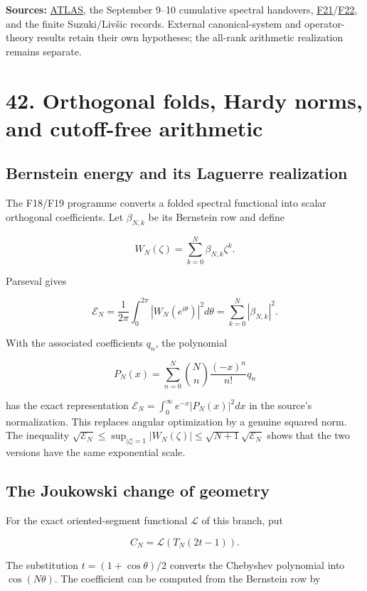 \documentclass[
  10pt,
  a4paper,
  10pt,
  oneside,
  openany]{book}
\begin{document}
\textbf{Sources:} \hyperref[source-atlas]{ATLAS}, the September 9--10
cumulative spectral handovers,
\hyperref[source-f21]{F21}/\hyperref[source-f22]{F22}, and the finite
Suzuki/Livšic records. External canonical-system and operator-theory
results retain their own hypotheses; the all-rank arithmetic realization
remains separate.

\section{42. Orthogonal folds, Hardy norms, and cutoff-free
arithmetic}\label{ch-folds}

\subsection{Bernstein energy and its Laguerre
realization}\label{bernstein-energy-and-its-laguerre-realization}

The F18/F19 programme converts a folded spectral functional into scalar
orthogonal coefficients. Let \(\beta_{N,k}\) be its Bernstein row and
define

\[
 W_N(\zeta)=\sum_{k=0}^{N}\beta_{N,k}\zeta^k.
\]

Parseval gives

\[
 \mathcal E_N=\frac1{2\pi}\int_0^{2\pi}|W_N(e^{i\theta})|^2d\theta
 =\sum_{k=0}^{N}|\beta_{N,k}|^2.
 \tag{42.1}\label{eq:42.1}
\]

With the associated coefficients \(q_n\), the polynomial

\[
 P_N(x)=\sum_{n=0}^{N}\binom Nn\frac{(-x)^n}{n!}q_n
\]

has the exact representation
\(\mathcal E_N=\int_0^\infty e^{-x}|P_N(x)|^2dx\) in the source's
normalization. This replaces angular optimization by a genuine squared
norm. The inequality
\(\sqrt{\mathcal E_N}\le\sup_{|\zeta|=1}|W_N(\zeta)|\le\sqrt{N+1}\sqrt{\mathcal E_N}\)
shows that the two versions have the same exponential scale.

\subsection{The Joukowski change of
geometry}\label{the-joukowski-change-of-geometry}

For the exact oriented-segment functional \(\mathcal L\) of this branch,
put

\[
 C_N=\mathcal L(T_N(2t-1)).
\]

The substitution \(t=(1+\cos\theta)/2\) converts the Chebyshev
polynomial into \(\cos(N\theta)\). The coefficient can be computed from
the Bernstein row by
\end{document}
